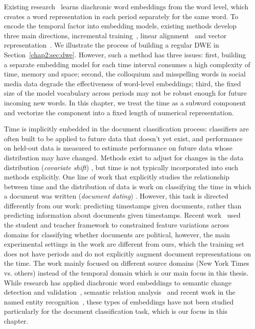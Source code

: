 Existing research~\cite{kim2014temporal, hamilton2016diachronic, yao2018dynamic, kutuzov2018diachronic} learns diachronic word embeddings from the word level, which creates a word representation in each period separately for the same word.
To encode the temporal factor into embedding models, existing methods develop three main directions, incremental training~\cite{kim2014temporal}, linear alignment~\cite{kulkarni2015statistically, hamilton2016diachronic} and vector representation~\cite{rosenfeld2018deep, huang2019neural}.
We illustrate the process of building a regular DWE in Section~\ref{chap2:sec:dwe}.
However, such a method has three issues: first, building a separate embedding model for each time interval consumes a high complexity of time, memory and space; second, the colloquium and misspelling words in social media data degrade the effectiveness of word-level embeddings; third, the fixed size of the model vocabulary across periods may not be robust enough for future incoming new words.
In this chapter, we treat the time as a subword component and vectorize the component into a fixed length of numerical representation.


Time is implicitly embedded in the document classification process: 
classifiers are often built to be applied to future data that doesn't yet exist,
and performance on held-out data is measured to estimate performance on future data whose distribution may have changed.
Methods exist to adjust for changes in the data distribution ({\em covariate shift}) \cite{shimodaira2000improving, bickel2009discriminative},
but time is not typically incorporated into such methods explicitly.
One line of work that explicitly studies the relationship between time and the distribution of data is work on classifying the time in which a document was written ({\em document dating}) \cite{kanhabua2008improving, chambers2012labeling, kotsakos2014burstines}.
However, this task is directed differently from our work: predicting timestamps given documents, rather than predicting information about documents given timestamps.
Recent work~\cite{desai2019adaptive} used the student and teacher framework to constrained feature variations across domains for classifying whether documents are political, however, the main experimental settings in the work are different from ours, which the training set does not have periods and do not explicitly augment document representations on the time. The work mainly focused on different source domains (New York Times vs. others) instead of the temporal domain which is our main focus in this thesis.
While research has applied diachronic word embeddings to semantic change detection and validation~\cite{mihalcea2012word, kim2014temporal, kulkarni2015statistically, hamilton2016diachronic, dubossarsky2017outta, yao2018dynamic, rudolph2018dynamic, rosenfeld2018deep, hu2019diachronic}, semantic relation analysis~\cite{liao2016analysing, szymanski2017temporal, rosin2017learning} and recent work in the named entity recognition~\cite{rijhwani2020temporally}, these types of embeddings have not been studied particularly for the document classification task, which is our focus in this chapter.


